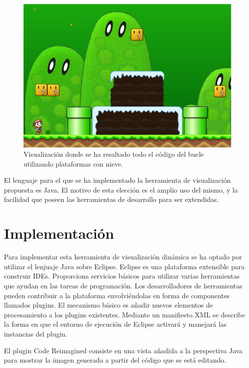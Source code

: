 \documentclass{llncs}
\begin{document}
\begin{figure}[ht]
\begin{center}
\includegraphics[scale=0.15]{images/texture.eps}
\caption{Visualización donde se ha resaltado todo el código del bucle utilizando plataformas con nieve.
\label{fig:texture}}
\end{center}
\end{figure}

El lenguaje para el que se ha implementado la herramienta de visualización propuesta es Java. El motivo de esta elección es el amplio uso del mismo, y la facilidad que poseen las herramientas de desarrollo para ser extendidas.



\section{Implementación}
\label{sec:details}
Para implementar esta herramienta de visualización dinámica se ha optado por utilizar el lenjuaje Java sobre Eclipse. Eclipse es una plataforma extensible para construir IDEs. Proporciona servicios básicos para utilizar varias herramientas que ayudan en las tareas de programación. Los desarrolladores de herramientas pueden contribuir a la plataforma envolviéndolas en forma de componentes llamados plugins. El mecanismo básico es añadir nuevos elementos de procesamiento a los plugins existentes. Mediante un manifiesto XML se describe la forma en que el entorno de ejecución de Eclipse activará y manejará las instancias del plugin. 

El plugin Code Reimagined consiste en una vista añadida a la perspectiva Java para mostrar la imagen generada a partir del código que se está editando. 
\end{document}
